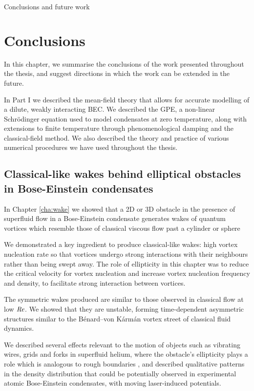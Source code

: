 \begin{chapter}{\label{cha:conc}Conclusions and future work}
\section{Conclusions}
In this chapter, we summarise the conclusions of the work presented throughout the thesis, and suggest directions in which the work can be extended in the future. 

In Part I we described the mean-field theory that allows for accurate modelling of a dilute, weakly interacting BEC. We described the GPE, a non-linear Schr\"odinger equation used to model condensates at zero temperature, along with extensions to finite temperature through phenomenological damping and the classical-field method. We also described the theory and practice of various numerical procedures we have used throughout the thesis.

\subsection{Classical-like wakes behind elliptical obstacles in Bose-Einstein condensates}
In Chapter \ref{cha:wake} we showed that a 2D or 3D obstacle in the presence of superfluid flow in a Bose-Einstein condensate generates wakes of quantum vortices which resemble those of classical viscous flow past a cylinder or sphere

We demonstrated a key ingredient to produce classical-like wakes: high vortex nucleation rate so that vortices undergo strong interactions with their neighbours rather than being swept away. The role of ellipticity in this chapter was to reduce the critical velocity for vortex nucleation and increase vortex nucleation frequency and density, to facilitate strong interaction between vortices.  

The symmetric wakes produced are similar to those observed in classical flow at low $\mbox{\ensuremath{\mathit{Re}}}$. We showed that they are unstable, forming time-dependent asymmetric structures similar to the B\'enard--von K\'arm\'an vortex street of classical fluid dynamics.

We described several effects relevant to the motion of objects such as vibrating wires, grids and forks in superfluid helium, where the obstacle's ellipticity plays a role which is analogous to rough boundaries \cite{blaz08,brad05}, and described qualitative patterns in the density distribution that could be potentially observed in experimental atomic Bose-Einstein condensates, with moving laser-induced potentials.


\end{chapter}
